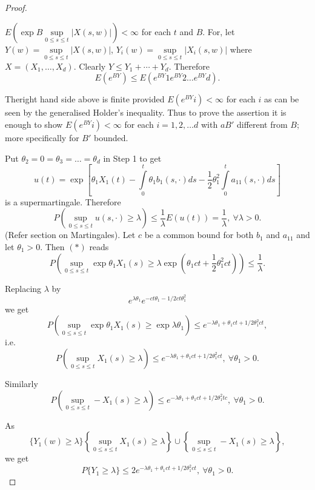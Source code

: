 \begin{proof}
\begin{step}%
$E(\exp B\sup\limits_{0\leq s\leq t}|X(s,w)|)<\infty$ for each $t$ and
  $B$. For, let $Y(w)=\sup\limits_{0\leq s\leq t}|X(s,w)|$,
  $Y_{i}(w)=\sup\limits_{0\leq s\leq t}|X_{i}(s,w)|$ where
  $X=(X_{1},\ldots,X_{d})$. Clearly $Y\leq
  Y_{1}+\cdots+Y_{d}$. Therefore
$$
E(e^{BY})\leq E(e^{BY}1 e^{BY}2\ldots e^{BY}d).
$$
\end{step}

The\pageoriginale right hand side above is finite provided
$E(e^{BY}i)<\infty$ for each $i$ as can be seen by the generalised
Holder's inequality. Thus to prove the assertion it is enough to show
$E(e^{BY}i)<\infty$ for each $i=1,2,\ldots d$ with $aB'$ different
from $B$; more specifically for $B'$ bounded.

Put $\theta_{2}=0=\theta_{3}=\ldots=\theta_{d}$ in Step 1 to get
$$
u(t)=\exp[\theta_{1}X_{1}(t)-\int\limits^{t}_{0}\theta_{1}b_{1}(s,\cdot)ds-\frac{1}{2}\theta^{2}_{1}\int\limits^{t}_{0}a_{11}(s,\cdot)ds]
$$
is a supermartingale. Therefore
\begin{equation*}
P\left(\sup\limits_{0\leq s\leq t}u(s,\cdot)\geq \lambda\right)\leq
\frac{1}{\lambda}E(u(t))=\frac{1}{\lambda},\ \forall \lambda >0.
\end{equation*}
(Refer section on Martingales). Let $c$ be a common bound for both
$b_{1}$ and $a_{11}$ and let $\theta_{1}>0$. Then $(*)$ reads
$$
P\left(\sup\limits_{0\leq s\leq t}\exp\theta_{1}X_{1}(s)\geq \lambda
\exp(\theta_{1}ct+\frac{1}{2}\theta^{2}_{1}ct)\right)\leq
\frac{1}{\lambda}. 
$$

Replacing $\lambda$ by
$$
e^{\lambda\theta_{1}}e^{-ct\theta_{1}-1/2 ct\theta^{2}_{1}}
$$
we get
$$
P\left(\sup\limits_{0\leq s\leq t}\exp\theta_{1}X_{1}(s)\geq
\exp\lambda \theta_{1}\right)\leq
e^{-\lambda\theta_{1}+\theta_{1}ct+1/2\theta^{2}_{1}ct},
$$
i.e.
$$
P\left(\sup\limits_{0\leq s\leq t}X_{1}(s)\geq \lambda\right)\leq
e^{-\lambda\theta_{1}+\theta_{1}ct+1/2\theta_{1}^{2}ct},\ \forall \theta_{1}>0.
$$

Similarly
$$
P\left(\sup\limits_{0\leq s\leq t}-X_{1}(s)\geq \lambda\right)\leq
e^{-\lambda\theta_{1}+\theta_{1}ct+1/2\theta^{2}_{1}tc},\ \forall \theta_{1}>0.
$$

As
$$
\{Y_{1}(w)\geq \lambda\}\left\{\sup\limits_{0\leq s\leq t}X_{1}(s)\geq
\lambda\right\}\cup\left\{\sup\limits_{0\leq s\leq t}-X_{1}(s)\geq
\lambda\right\}, 
$$\pageoriginale
we get
$$
P\{Y_{1}\geq \lambda\}\leq
2e^{-\lambda\theta_{1}+\theta_{1}ct+1/2\theta^{2}_{1}ct},\ \forall \theta_{1}>0.
$$


\end{proof}
